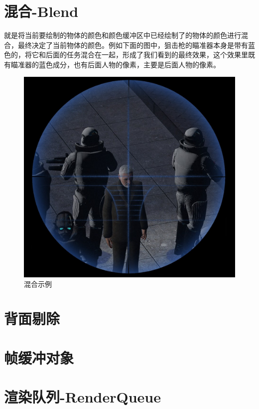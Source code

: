 \documentclass[UTF8,a4paper,12pt]{ctexbook}
\begin{document}
	\section{混合-Blend}
			就是将当前要绘制的物体的颜色和颜色缓冲区中已经绘制了的物体的颜色进行混合，最终决定了当前物体的颜色。例如下面的图中，狙击枪的瞄准器本身是带有蓝色的，将它和后面的任务混合在一起，形成了我们看到的最终效果，这个效果里既有瞄准器的蓝色成分，也有后面人物的像素，主要是后面人物的像素。
					\begin{figure}[H]
						\centering
						\includegraphics[scale=0.64]{blend}
						\caption{混合示例}
					\end{figure}
			
			
	\section{背面剔除}
	
	
	\section{帧缓冲对象}
	
	
	\section{渲染队列-RenderQueue}
	
	
			
\end{document}
